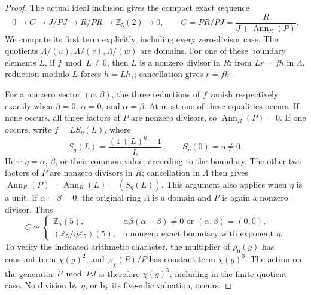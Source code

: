 \begin{proof}
The actual ideal inclusion gives the compact exact sequence
\[
 0\longrightarrow C\longrightarrow J/PJ
       \longrightarrow R/PR\longrightarrow\mathbb Z_5(2)
       \longrightarrow0,\qquad
 C=PR/PJ=\frac{R}{J+\operatorname{Ann}_R(P)}.
                                                               \tag{D.81.13}
\]
We compute its first term explicitly, including every zero-divisor case.
The quotients \(\Lambda/(u),\Lambda/(v),\Lambda/(w)\) are domains.
For one of these boundary elements \(L\), if \(f\bmod L\ne0\),
then \(L\) is a nonzero divisor in \(R\): from \(Lr=fh\) in
\(\Lambda\), reduction modulo \(L\) forces \(h=Lh_1\);
cancellation gives \(r=fh_1\).

For a nonzero vector \((\alpha,\beta)\), the three reductions
of \(f\) vanish respectively exactly when
\(\beta=0\), \(\alpha=0\), and \(\alpha=\beta\).
At most one of these equalities occurs. If none occurs, all
three factors of \(P\) are nonzero divisors, so
\(\operatorname{Ann}_R(P)=0\). If one occurs, write
\(f=L S_\eta(L)\), where
\[
 S_\eta(L)=\frac{(1+L)^\eta-1}{L},\qquad S_\eta(0)=\eta\ne0.
 \]
Here \(\eta=\alpha\), \(\beta\), or their common value,
according to the boundary. The other two factors of \(P\)
are nonzero divisors in \(R\); cancellation in \(\Lambda\)
then gives
\(\operatorname{Ann}_R(P)=\operatorname{Ann}_R(L)=(S_\eta(L))\).
This argument also applies when \(\eta\) is a unit.
If \(\alpha=\beta=0\), the original ring \(\Lambda\) is a
domain and \(P\) is again a nonzero divisor. Thus
\[
 C\simeq
 \begin{cases}
  \mathbb Z_5(5),&
       \alpha\beta(\alpha-\beta)\ne0
                     \text{ or }(\alpha,\beta)=(0,0),\\
  (\mathbb Z_5/\eta\mathbb Z_5)(5),&
       \text{a nonzero exact boundary with exponent }\eta .
 \end{cases}                                                 \tag{D.81.14}
\]
To verify the indicated arithmetic character, the multiplier
of \(\rho_0(g)\) has constant term \(\chi(g)^2\), and
\(\varphi_\chi(P)/P\) has constant term \(\chi(g)^3\).
The action on the generator \(P\bmod PJ\) is therefore
\(\chi(g)^5\), including in the finite quotient case.
No division by \(\eta\), or by its five-adic valuation, occurs.


\end{proof}
